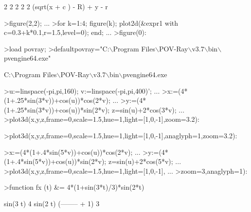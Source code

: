 \documentclass[a4paper,10pt]{article}
\begin{document}
\begin{eulernotebook}
\begin{eulercomment}
\begin{eulercomment}
\begin{euleroutput}
                             2    2      2    2    2
                      (sqrt(x  + c ) - R)  + y  - r
  
\end{euleroutput}
\begin{eulerprompt}
>figure(2,2); ...
>for k=1:4; figure(k); plot2d(&expr1 with c=0.3+k*0.1,r=1.5,level=0); end; ...
>figure(0):
\end{eulerprompt}
\begin{eulerprompt}
>load povray;
>defaultpovray="C:\(\backslash\)Program Files\(\backslash\)POV-Ray\(\backslash\)v3.7\(\backslash\)bin\(\backslash\)pvengine64.exe"
\end{eulerprompt}
\begin{euleroutput}
  C:\(\backslash\)Program Files\(\backslash\)POV-Ray\(\backslash\)v3.7\(\backslash\)bin\(\backslash\)pvengine64.exe
\end{euleroutput}
\begin{eulerprompt}
>u:=linspace(-pi,pi,160); v:=linspace(-pi,pi,400)'; ...
>x:=(4*(1+.25*sin(3*v))+cos(u))*cos(2*v); ...
>y:=(4*(1+.25*sin(3*v))+cos(u))*sin(2*v); z=sin(u)+2*cos(3*v); ...
>plot3d(x,y,z,frame=0,scale=1.5,hue=1,light=[1,0,-1],zoom=3.2):
\end{eulerprompt}
\begin{eulerprompt}
>plot3d(x,y,z,frame=0,scale=1.5,hue=1,light=[1,0,-1],anaglyph=1,zoom=3.2):
\end{eulerprompt}
\begin{eulerprompt}
>x:=(4*(1+.4*sin(5*v))+cos(u))*cos(2*v); ...
>y:=(4*(1+.4*sin(5*v))+cos(u))*sin(2*v); z=sin(u)+2*cos(5*v); ...
>plot3d(x,y,z,frame=0,scale=1.5,hue=1,light=[1,0,-1], ...
>zoom=3,anaglyph=1):
\end{eulerprompt}
\begin{eulerprompt}
>function fx (t) &= 4*(1+sin(3*t)/3)*sin(2*t)
\end{eulerprompt}
\begin{euleroutput}
  
                                    sin(3 t)
                        4 sin(2 t) (-------- + 1)
                                       3
  

\end{euleroutput}
\end{eulercomment}
\end{eulercomment}
\end{eulernotebook}
\end{document}
